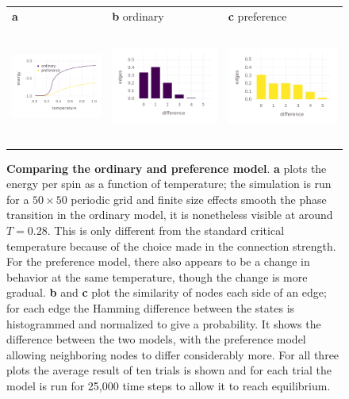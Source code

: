 \documentclass[letterpaper]{article}
\begin{document}
\begin{figure}[ht]
\begin{center}
\begin{tabular}{lll}
\textbf{a}&\textbf{b} ordinary&\textbf{c} preference\\
\includegraphics[height=1.5in]{energy_original.png}&\includegraphics[height=1.5in]{ord_hist.png}&\includegraphics[height=1.5in]{evo_hist.png}
\end{tabular}
\caption{\textbf{Comparing the ordinary and preference model}. \textbf{a} plots the energy per spin as a function of temperature; the simulation is run for a $50\times 50$ periodic grid and finite size effects smooth the phase transition in the ordinary model, it is nonetheless visible at around $T=0.28$. This is only different from the standard critical temperature because of the choice made in the connection strength. For the preference model, there also appears to be a change in behavior at the same temperature, though the change is more gradual. \textbf{b} and \textbf{c} plot the similarity of nodes each side of an edge; for each edge the Hamming difference between the states is histogrammed and normalized to give a probability. It shows the difference between the two models, with the preference model allowing neighboring nodes to differ considerably more. For all three plots the average result of ten trials is shown and for each trial the model is run for 25,000 time steps to allow it to reach equilibrium.}
\label{figure}
\end{center}
\end{figure}
\end{document}
